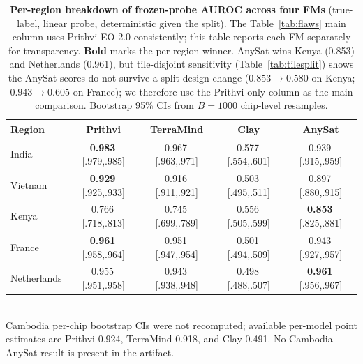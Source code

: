 \documentclass{article}
\newcommand{\tablebodygap}{\vspace{0.45em}}
\begin{document}
\begin{table}[H]\centering\small
\caption{\textbf{Per-region breakdown of frozen-probe AUROC across four FMs}
(true-label, linear probe, deterministic given the split). The Table~\ref{tab:flaws}
main column uses Prithvi-EO-2.0 consistently; this table reports each FM separately
for transparency. \textbf{Bold} marks the per-region winner. AnySat wins Kenya
(0.853) and Netherlands (0.961), but tile-disjoint sensitivity
(Table~\ref{tab:tilesplit}) shows the AnySat scores do not survive a split-design
change ($0.853\to0.580$ on Kenya; $0.943\to0.605$ on France); we therefore use the
Prithvi-only column as the main comparison. Bootstrap 95\% CIs from $B{=}1000$ chip-level
resamples.}
\label{tab:fm_breakdown}
\tablebodygap
\begin{tabular}{lcccc}
\toprule
Region & Prithvi & TerraMind & Clay & AnySat \\
\midrule
India        & \textbf{0.983}\,{\scriptsize[.979,.985]} & 0.967\,{\scriptsize[.963,.971]} & 0.577\,{\scriptsize[.554,.601]} & 0.939\,{\scriptsize[.915,.959]} \\
Vietnam      & \textbf{0.929}\,{\scriptsize[.925,.933]} & 0.916\,{\scriptsize[.911,.921]} & 0.503\,{\scriptsize[.495,.511]} & 0.897\,{\scriptsize[.880,.915]} \\
Kenya        & 0.766\,{\scriptsize[.718,.813]} & 0.745\,{\scriptsize[.699,.789]} & 0.556\,{\scriptsize[.505,.599]} & \textbf{0.853}\,{\scriptsize[.825,.881]} \\
France       & \textbf{0.961}\,{\scriptsize[.958,.964]} & 0.951\,{\scriptsize[.947,.954]} & 0.501\,{\scriptsize[.494,.509]} & 0.943\,{\scriptsize[.927,.957]} \\
Netherlands  & 0.955\,{\scriptsize[.951,.958]} & 0.943\,{\scriptsize[.938,.948]} & 0.498\,{\scriptsize[.488,.507]} & \textbf{0.961}\,{\scriptsize[.956,.967]} \\
\bottomrule
\end{tabular}
\\[2pt]
{\scriptsize Cambodia per-chip bootstrap CIs were not recomputed; available
per-model point estimates are Prithvi 0.924, TerraMind 0.918, and Clay 0.491.
No Cambodia AnySat result is present in the artifact.}
\end{table}
\end{document}
